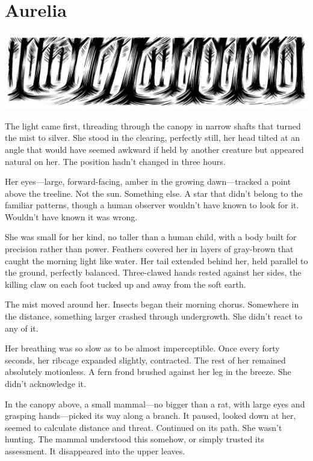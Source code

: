 \chapter{Aurelia}
\label{ch:01}



\begin{center}
\includegraphics[width=\textwidth]{images/chapterImages/genesis_sketch_00053_.png}
\end{center}

The light came first, threading through the canopy in narrow shafts that turned the mist to silver. She stood in the clearing, perfectly still, her head tilted at an angle that would have seemed awkward if held by another creature but appeared natural on her. The position hadn't changed in three hours.

Her eyes—large, forward-facing, amber in the growing dawn—tracked a point above the treeline. Not the sun. Something else. A star that didn't belong to the familiar patterns, though a human observer wouldn't have known to look for it. Wouldn't have known it was wrong.

She was small for her kind, no taller than a human child, with a body built for precision rather than power. Feathers covered her in layers of gray-brown that caught the morning light like water. Her tail extended behind her, held parallel to the ground, perfectly balanced. Three-clawed hands rested against her sides, the killing claw on each foot tucked up and away from the soft earth.

The mist moved around her. Insects began their morning chorus. Somewhere in the distance, something larger crashed through undergrowth. She didn't react to any of it.

Her breathing was so slow as to be almost imperceptible. Once every forty seconds, her ribcage expanded slightly, contracted. The rest of her remained absolutely motionless. A fern frond brushed against her leg in the breeze. She didn't acknowledge it.

In the canopy above, a small mammal—no bigger than a rat, with large eyes and grasping hands—picked its way along a branch. It paused, looked down at her, seemed to calculate distance and threat. Continued on its path. She wasn't hunting. The mammal understood this somehow, or simply trusted its assessment. It disappeared into the upper leaves.

